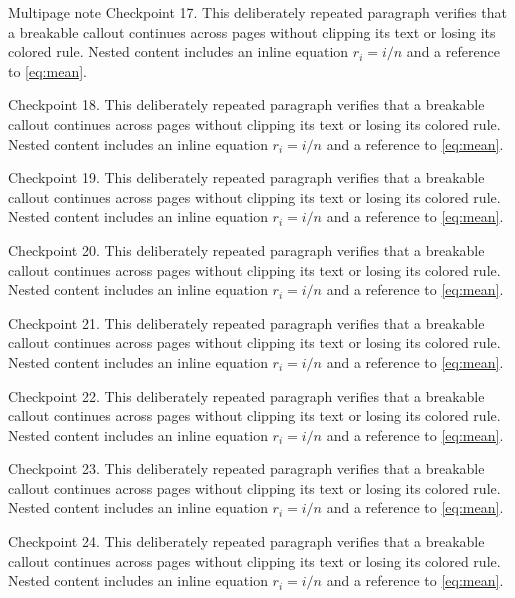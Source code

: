 \documentclass[algorithms,listings]{tempusreport}
\begin{document}
\begin{reportbox}{Multipage note}
Checkpoint 17. This deliberately repeated paragraph verifies that a breakable callout continues across pages without clipping its text or losing its colored rule. Nested content includes an inline equation $r_i=i/n$ and a reference to \cref{eq:mean}.

Checkpoint 18. This deliberately repeated paragraph verifies that a breakable callout continues across pages without clipping its text or losing its colored rule. Nested content includes an inline equation $r_i=i/n$ and a reference to \cref{eq:mean}.

Checkpoint 19. This deliberately repeated paragraph verifies that a breakable callout continues across pages without clipping its text or losing its colored rule. Nested content includes an inline equation $r_i=i/n$ and a reference to \cref{eq:mean}.

Checkpoint 20. This deliberately repeated paragraph verifies that a breakable callout continues across pages without clipping its text or losing its colored rule. Nested content includes an inline equation $r_i=i/n$ and a reference to \cref{eq:mean}.

Checkpoint 21. This deliberately repeated paragraph verifies that a breakable callout continues across pages without clipping its text or losing its colored rule. Nested content includes an inline equation $r_i=i/n$ and a reference to \cref{eq:mean}.

Checkpoint 22. This deliberately repeated paragraph verifies that a breakable callout continues across pages without clipping its text or losing its colored rule. Nested content includes an inline equation $r_i=i/n$ and a reference to \cref{eq:mean}.

Checkpoint 23. This deliberately repeated paragraph verifies that a breakable callout continues across pages without clipping its text or losing its colored rule. Nested content includes an inline equation $r_i=i/n$ and a reference to \cref{eq:mean}.

Checkpoint 24. This deliberately repeated paragraph verifies that a breakable callout continues across pages without clipping its text or losing its colored rule. Nested content includes an inline equation $r_i=i/n$ and a reference to \cref{eq:mean}.
\end{reportbox}
\end{document}
